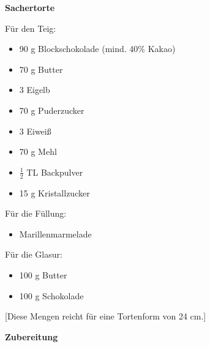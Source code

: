 
\parindent0pt	

\pagestyle{empty}


\textbf{{\LARGE Sachertorte}}%

\hrulefill
\vspace*{\fill}
\begin{multicols}{2}	


Für den Teig:
\begin{itemize}
\item 90 g 	Blockschokolade \newline
(mind. 40\% Kakao)
\item 70 g  Butter
\item 3  	Eigelb
\item 70 g 	Puderzucker
\item 3  	Eiweiß
\item 70 g Mehl
\item $\frac{1}{2}$ TL Backpulver
\item 15 g Kristallzucker
\end{itemize}

Für die Füllung:
\begin{itemize}
\item Marillenmarmelade
\end{itemize}
Für die Glasur:
\begin{itemize}
\item 100 g Butter
\item 100 g Schokolade 
\end{itemize}

\end{multicols}
\vfill

\vspace{0.5cm}
%
\begin{center}
%
[Diese Mengen reicht für eine Tortenform von 24 cm.]%
\end{center}
\vfill

\newpage
\textbf{{\LARGE Zubereitung}}%

\hrulefill

